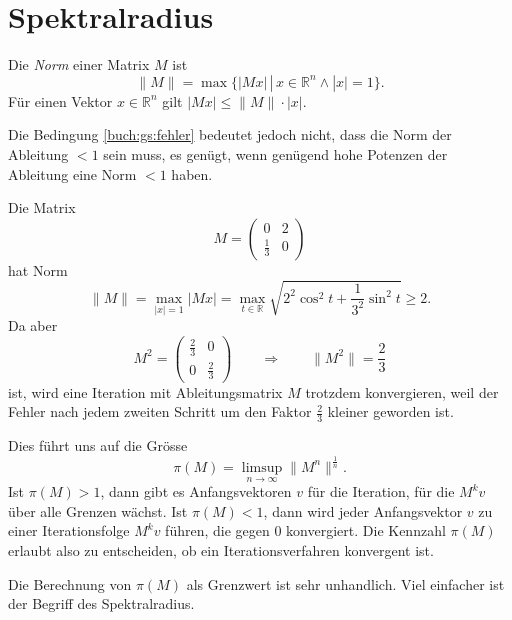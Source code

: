 %
%
%
\section{Spektralradius
\label{buch:section:spektralradius}}

\begin{definition}
%
Die {\em Norm} einer Matrix $M$ ist
\[
\|M\|
=
\max\{|Mx|\,|\, x\in\mathbb R^n\wedge |x|=1\}.
\]
Für einen Vektor $x\in\mathbb R^n$ gilt $|Mx| \le \|M\|\cdot |x|$.
\end{definition}

Die Bedingung \eqref{buch:gs:fehler} bedeutet jedoch nicht,
dass die Norm der Ableitung $<1$ sein muss, es genügt, wenn
genügend hohe Potenzen der Ableitung eine Norm $<1$ haben.
%

\begin{beispiel}
Die Matrix
\[
M=\begin{pmatrix}
0&2\\
\frac13&0
\end{pmatrix}
\]
hat Norm
\[
\|M\|
=
\max_{|x|=1} |Mx| 
=
\max_{t\in\mathbb R} \sqrt{2^2\cos^2 t +\frac1{3^2}\sin^2t} \ge 2.
\]
Da aber
\[
M^2 = \begin{pmatrix}
\frac{2}{3}&0\\
0&\frac{2}{3}
\end{pmatrix}
\qquad\Rightarrow\qquad \|M^2\|=\frac23
\]
ist, wird eine Iteration mit Ableitungsmatrix $M$ trotzdem
konvergieren, weil der Fehler nach jedem zweiten Schritt um den
Faktor $\frac23$ kleiner geworden ist.
\end{beispiel}

Dies führt uns auf die Grösse
\begin{equation}
\pi(M)
=
\limsup_{n\to\infty} \|M^n\|^\frac1n.
\label{buch:eqn:gelfand-grenzwert}
\end{equation}
Ist $\pi(M) > 1$, dann gibt es Anfangsvektoren $v$ für die Iteration,
für die $M^kv$ über alle Grenzen wächst.
Ist $\pi(M) < 1$, dann wird jeder Anfangsvektor $v$ zu einer Iterationsfolge
$M^kv$ führen, die gegen $0$ konvergiert.
Die Kennzahl $\pi(M)$ erlaubt also zu entscheiden, ob ein
Iterationsverfahren konvergent ist.
%

Die Berechnung von $\pi(M)$ als Grenzwert ist sehr unhandlich.
Viel einfacher ist der Begriff des Spektralradius.
%

